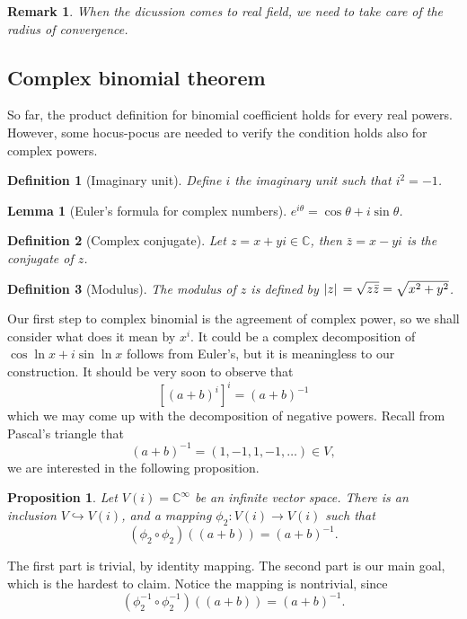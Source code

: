 \documentclass[12pt]{article}
\newtheorem*{definition}{Definition}
\newtheorem*{lemma}{Lemma}
\newtheorem*{proposition}{Proposition}
\newtheorem*{remark}{Remark}
\begin{document}
    \begin{remark}
        When the dicussion comes to real field, we need to take care of the radius of convergence.
    \end{remark}

    \subsection{Complex binomial theorem}

    So far, the product definition for binomial coefficient holds for every real powers. However, some hocus-pocus are needed to verify the condition holds also for complex powers.

    \begin{definition}[Imaginary unit]
        Define $i$ the imaginary unit such that $i^2=-1$.
    \end{definition}

    \begin{lemma}[Euler's formula for complex numbers]
        $e^{i\theta}=\cos{\theta}+i\sin{\theta}$.
    \end{lemma}

    \begin{definition}[Complex conjugate]
        Let $z=x+yi\in\mathbb{C}$, then $\bar{z}=x-yi$ is the conjugate of $z$.
    \end{definition}

    \begin{definition}[Modulus]
        The modulus of $z$ is defined by $\abs*{z}=\sqrt{z\bar{z}}=\sqrt{x^2+y^2}$.
    \end{definition}

    Our first step to complex binomial is the agreement of complex power, so we shall consider what does it mean by $x^i$. It could be a complex decomposition of $\cos{\ln{x}}+i\sin{\ln{x}}$ follows from Euler's, but it is meaningless to our construction. It should be very soon to observe that \[[(a+b)^i]^i=(a+b)^{-1}\] which we may come up with the decomposition of negative powers. Recall from Pascal's triangle that \[(a+b)^{-1}=(1,-1,1,-1,\dots)\in V,\] we are interested in the following proposition.

    \begin{proposition}
        Let $V(i)=\mathbb{C}^{\infty}$ be an infinite vector space. There is an inclusion $V\hookrightarrow V(i)$, and a mapping $\phi_2:V(i)\to V(i)$ such that \[(\phi_2\circ \phi_2)((a+b))=(a+b)^{-1}.\]
    \end{proposition}

    The first part is trivial, by identity mapping. The second part is our main goal, which is the hardest to claim. Notice the mapping is nontrivial, since \[(\phi_2^{-1}\circ \phi_2^{-1})((a+b))=(a+b)^{-1}.\]
\end{document}
